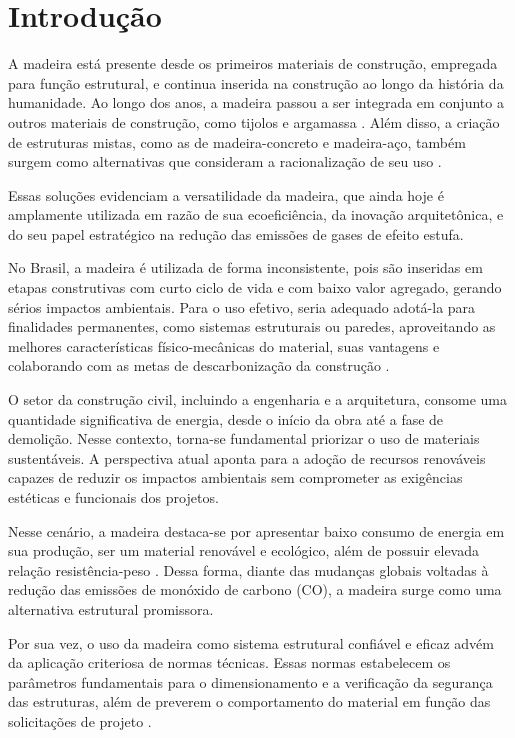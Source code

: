 \chapter{Introdução}

A madeira está presente desde os primeiros materiais de construção, empregada para função estrutural, e continua inserida na construção ao longo da história da humanidade. Ao longo dos anos, a madeira passou a ser integrada em conjunto a outros materiais de construção, como tijolos e argamassa \parencite{NEVES2025}. Além disso, a criação de estruturas mistas, como as de madeira-concreto e madeira-aço, também surgem como alternativas que consideram a racionalização de seu uso \parencite{MIOTTO2009}.

Essas soluções evidenciam a versatilidade da madeira, que ainda hoje é amplamente utilizada em razão de sua ecoeficiência, da inovação arquitetônica, e do seu papel estratégico na redução das emissões de gases de efeito estufa.

No Brasil, a madeira é utilizada de forma inconsistente, pois são inseridas em etapas construtivas com curto ciclo de vida e com baixo valor agregado, gerando sérios impactos ambientais. Para o uso efetivo, seria adequado adotá-la para finalidades permanentes, como sistemas estruturais ou paredes, aproveitando as melhores características físico-mecânicas do material, suas vantagens e colaborando com as metas de descarbonização da construção \parencite{NEVES2025}.

O setor da construção civil, incluindo a engenharia e a arquitetura, consome uma quantidade significativa de energia, desde o início da obra até a fase de demolição. Nesse contexto, torna-se fundamental priorizar o uso de materiais sustentáveis. A perspectiva atual aponta para a adoção de recursos renováveis capazes de reduzir os impactos ambientais sem comprometer as exigências estéticas e funcionais dos projetos. 

Nesse cenário, a madeira destaca-se por apresentar baixo consumo de energia em sua produção, ser um material renovável e ecológico, além de possuir elevada relação resistência-peso \parencite{FRAGA2025}. Dessa forma, diante das mudanças globais voltadas à redução das emissões de monóxido de carbono (CO), a madeira surge como uma alternativa estrutural promissora.

Por sua vez, o uso da madeira como sistema estrutural confiável e eficaz advém da aplicação criteriosa de normas técnicas. Essas normas estabelecem os parâmetros fundamentais para o dimensionamento e a verificação da segurança das estruturas, além de preverem o comportamento do material em função das solicitações de projeto \parencite{ADOLFS2011}.

